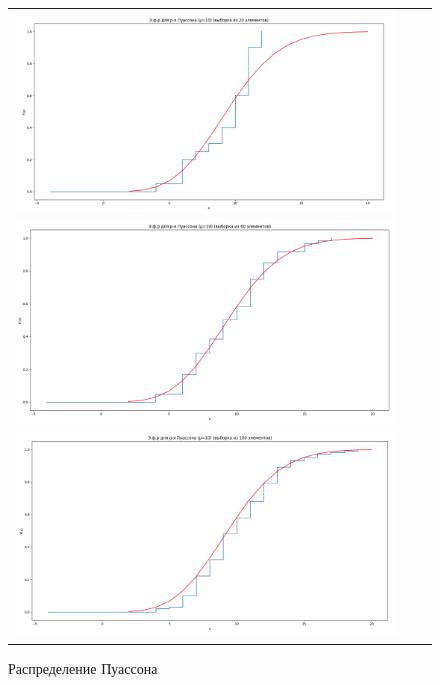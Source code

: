 \begin{figure}[H]
	\begin{tabular}{ccc}
		\includegraphics[scale=0.14]{resources/4_poisson_20.png}
		\includegraphics[scale=0.14]{resources/4_poisson_60.png}
		\includegraphics[scale=0.14]{resources/4_poisson_100.png}
	\end{tabular}
	\caption{Распределение Пуассона}
\end{figure}


